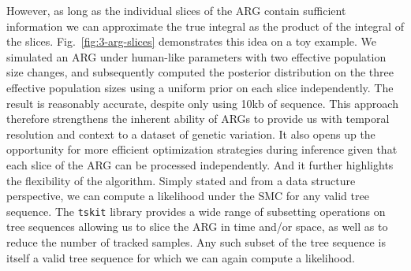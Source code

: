 \documentclass{article}
\begin{document}
However, as long as the individual slices of the ARG contain sufficient
information we can approximate the true integral as the product of the
integral of the slices. Fig.~\ref{fig:3-arg-slices} demonstrates this idea
on a toy example. We simulated an ARG under human-like parameters with
two effective population size changes, and subsequently computed the posterior
distribution on the three effective population sizes
using a uniform prior on each slice independently.
The result is reasonably accurate, despite only using 10kb of sequence.
This approach therefore strengthens
the inherent ability of ARGs to provide us with temporal
resolution and context to a dataset of genetic variation.
It also opens up the opportunity for more efficient optimization
strategies during inference given that each slice of the ARG can be
processed independently. And it further highlights the flexibility
of the algorithm. Simply stated and from a data structure perspective,
we can compute a likelihood under the SMC for any valid tree sequence.
The \texttt{tskit} library provides a wide range
of subsetting operations on tree sequences allowing us to slice
the ARG in time and/or space, as well as to reduce the number of
tracked samples. Any such subset of the tree sequence is itself
a valid tree sequence for which we can again compute a likelihood.
\end{document}
